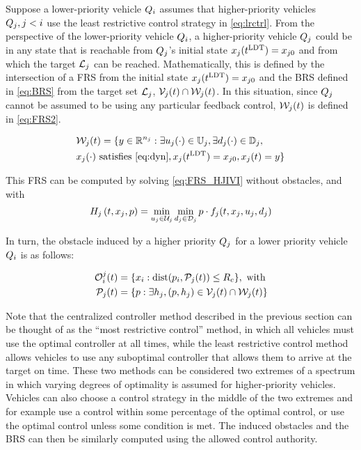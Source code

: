 Suppose a lower-priority vehicle $Q_{i}$ assumes that higher-priority vehicles $Q_{j}, j < i$ use the least restrictive control strategy in \eqref{eq:lrctrl}. From the perspective of the lower-priority vehicle $Q_{i}$, a higher-priority vehicle $Q_{j}$ could be in any state that is reachable from $Q_{j}$'s initial state $x_j(t^\text{LDT}) = x_{j0}$ and from which the target $\mathcal{L}_j$ can be reached. Mathematically, this is defined by the intersection of a FRS from the initial state $x_j(t^\text{LDT})=x_{j0}$ and the BRS defined in \eqref{eq:BRS} from the target set $\mathcal{L}_j$, $\mathcal{V}_j(t) \cap \mathcal{W}_j(t)$. In this situation, since $Q_{j}$ cannot be assumed to be using any particular feedback control, $\mathcal{W}_j(t)$ is defined in \eqref{eq:FRS2}.
\vspace{-0.4em}

\begin{equation}
\label{eq:FRS2}
\begin{aligned}
&\frs_j(t) = \{y \in \R^{n_j}: \exists u_j(\cdot)\in\cfset_j, \exists d_j(\cdot) \in \dfset_j, \\
&x_j(\cdot) \text{ satisfies \eqref{eq:dyn}}, x_j(\ldt) = x_{j0}, x_j(t) = y\}
\end{aligned}
\end{equation}

This FRS can be computed by solving \eqref{eq:FRS_HJIVI} without obstacles, and with
\vspace{-0.4em}
\begin{equation}
H_j\left(t, x_j, p\right) = \min_{u_j \in \mathcal{U}_j} \min_{d_j \in \mathcal{D}_j} p \cdot f_j(t, x_j, u_j, d_j)
\end{equation}

In turn, the obstacle induced by a higher priority $Q_{j}$ for a lower priority vehicle $Q_{i}$ is as follows:

\begin{equation}
\begin{aligned}
\mathcal{O}_i^j(t) &= \{x_i: \text{dist}(p_i, \mathcal{P}_j(t)) \le R_c \}, \text{ with} \\
\mathcal{P}_j(t) &= \{p: \exists h_j, (p, h_j) \in \mathcal{V}_j(t) \cap \mathcal{W}_j(t)\}
\end{aligned}
\end{equation}

Note that the centralized controller method described in the previous section can be thought of as the ``most restrictive control'' method, in which all vehicles must use the optimal controller at all times, while the least restrictive control method allows vehicles to use any suboptimal controller that allows them to arrive at the target on time. These two methods can be considered two extremes of a spectrum in which varying degrees of optimality is assumed for higher-priority vehicles. Vehicles can also choose a control strategy in the middle of the two extremes and for example use a control within some percentage of the optimal control, or use the optimal control unless some condition is met. The induced obstacles and the BRS can then be similarly computed using the allowed control authority.

